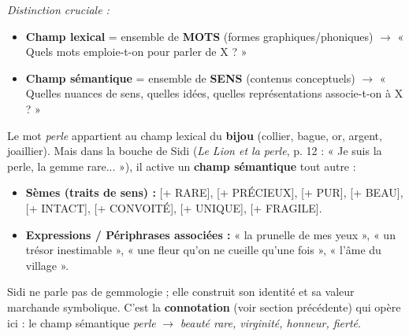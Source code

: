 \documentclass[11pt]{article}
\begin{document}
\emph{Distinction cruciale :}
\begin{itemize}
    \item \textbf{Champ lexical} = ensemble de \textbf{MOTS} (formes graphiques/phoniques) $\rightarrow$ « Quels mots emploie-t-on pour parler de X ? »
    \item \textbf{Champ sémantique} = ensemble de \textbf{SENS} (contenus conceptuels) $\rightarrow$ « Quelles nuances de sens, quelles idées, quelles représentations associe-t-on à X ? »
\end{itemize}

\begin{exemplebox}
Le mot \emph{perle} appartient au champ lexical du \textbf{bijou} (collier, bague, or, argent, joaillier).
Mais dans la bouche de Sidi (\emph{Le Lion et la perle}, p. 12 : « Je suis la perle, la gemme rare... »), il active un \textbf{champ sémantique} tout autre :
\begin{itemize}
    \item \textbf{Sèmes (traits de sens) :} [+ RARE], [+ PRÉCIEUX], [+ PUR], [+ BEAU], [+ INTACT], [+ CONVOITÉ], [+ UNIQUE], [+ FRAGILE].
    \item \textbf{Expressions / Périphrases associées :} « la prunelle de mes yeux », « un trésor inestimable », « une fleur qu'on ne cueille qu'une fois », « l'âme du village ».
\end{itemize}
Sidi ne parle pas de gemmologie ; elle construit son identité et sa valeur marchande symbolique. C'est la \textbf{connotation} (voir section précédente) qui opère ici : le champ sémantique \emph{perle} $\rightarrow$ \emph{beauté rare, virginité, honneur, fierté}.
\end{exemplebox}
\end{document}
